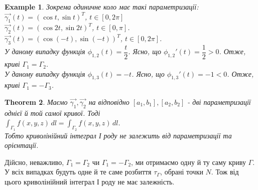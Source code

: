 \documentclass[a4paper, 10pt]{article}
\theoremstyle{theoremdd}
\newtheorem{theorem}{Theorem}[subsection]
\theoremstyle{theoremdd}
\theoremstyle{theoremdd}
\theoremstyle{theoremdd}
\newtheorem{example}[theorem]{Example}
\theoremstyle{theoremdd}
\theoremstyle{theoremdd}
\theoremstyle{theoremdd}
\theoremstyle{theoremdd}
\begin{document}
\begin{example}
Зокрема одиничне коло має такі параметризації:\\
$\vec{\gamma_1}(t) = (\cos t, \sin t)^T$, $t \in [0,2\pi]$\\
$\vec{\gamma_2}(t) = (\cos 2t, \sin 2t)^T$, $t \in [0,\pi]$.\\
$\vec{\gamma_3}(t) = (\cos(-t), \sin(-t))^T$, $t \in [0,2\pi]$.\\
У даному випадку функція $\phi_{1,2}(t) = \dfrac{t}{2}$. Ясно, що $\phi_{1,2}'(t) = \dfrac{1}{2} > 0$. Отже, криві $\Gamma_1 = \Gamma_2$.\\
У даному випадку функція $\phi_{1,3}(t) = -t$. Ясно, що $\phi_{1,3}'(t) = -1 < 0$. Отже, криві $\Gamma_1 = -\Gamma_3$.
\begin{figure}[H]
\centering
{}
\qquad
{}
\qquad
{}
\end{figure}
\end{example}

\begin{theorem}
Маємо $\vec{\gamma_1},\vec{\gamma_2}$ на відповідно $[a_1,b_1], [a_2,b_2]$ - дві параметризації однієї й той самої кривої. Тоді\\
$\displaystyle\int_{\Gamma_1} f(x,y,z)\,dl = \int_{\Gamma_2} f(x,y,z)\,dl$.\\
Тобто криволінійний інтеграл І роду не залежить від параметризації та орієнтації.
\end{theorem}

Дійсно, неважливо, $\Gamma_1 = \Gamma_2$ чи $\Gamma_1 = -\Gamma_2$, ми отримаємо одну й ту саму криву $\Gamma$. У всіх випадках будуть одне й те саме розбиття $\tau_\Gamma$, обрані точки $N$. Тож від цього криволінійний інтеграл І роду не має залежність.
\end{document}
